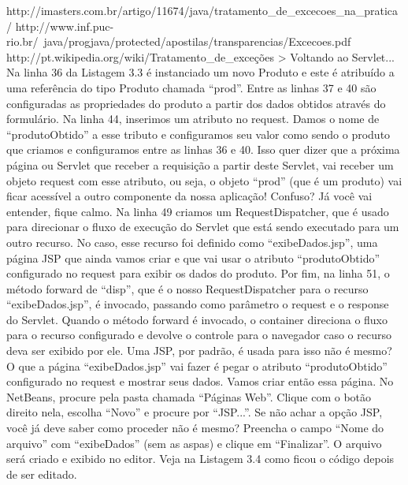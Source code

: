 http://imasters.com.br/artigo/11674/java/tratamento\_de\_excecoes\_na\_pratica/
http://www.inf.puc-rio.br/~java/progjava/protected/apostilas/transparencias/Excecoes.pdf
http://pt.wikipedia.org/wiki/Tratamento\_de\_exceções
>
Voltando ao Servlet... Na linha 36 da Listagem 3.3 é instanciado um novo Produto e este é atribuído a uma referência do tipo Produto chamada “prod”. Entre as linhas 37 e 40 são configuradas as propriedades do produto a partir dos dados obtidos através do formulário. Na linha 44, inserimos um atributo no request. Damos o nome de “produtoObtido” a esse tributo e configuramos  seu valor como sendo o produto que criamos e configuramos entre as linhas 36 e 40. Isso quer dizer que a próxima página ou Servlet que receber a requisição a partir deste Servlet, vai receber um objeto request com esse atributo, ou seja, o objeto “prod” (que é um produto) vai ficar acessível a outro componente da nossa aplicação! Confuso? Já você vai entender, fique calmo.
Na linha 49 criamos um RequestDispatcher, que é usado para direcionar o fluxo de execução do Servlet que está sendo executado para um outro recurso. No caso, esse recurso foi definido como “exibeDados.jsp”, uma página JSP que ainda vamos criar e que vai usar o atributo “produtoObtido” configurado no request para exibir os dados do produto.
Por fim, na linha 51, o método forward de “disp”, que é o nosso RequestDispatcher para o recurso “exibeDados.jsp”, é invocado, passando como parâmetro o request e o response do Servlet. Quando o método forward é invocado, o container direciona o fluxo para o recurso configurado e devolve o controle para o navegador caso o recurso deva ser exibido por ele. Uma JSP, por padrão, é usada para isso não é mesmo?
O que a página “exibeDados.jsp” vai fazer é pegar o atributo “produtoObtido” configurado no request e mostrar seus dados. Vamos criar então essa página. No NetBeans, procure pela pasta chamada “Páginas Web”. Clique com o botão direito nela, escolha “Novo” e procure por “JSP...”. Se não achar a opção JSP, você já deve saber como proceder não é mesmo? Preencha o campo “Nome do arquivo” com “exibeDados” (sem as aspas) e clique em “Finalizar”. O arquivo será criado e exibido no editor. Veja na Listagem 3.4 como ficou o código depois de ser editado.
















